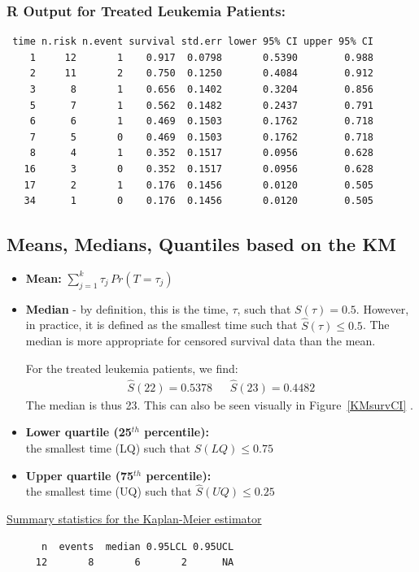 \documentclass[11pt,slidesonly,semrot,portrait,palatino]{book}
\begin{document}
\subsubsection{R Output for Treated Leukemia Patients:}
\begin{verbatim}
 time n.risk n.event survival std.err lower 95% CI upper 95% CI
    1     12       1    0.917  0.0798       0.5390        0.988
    2     11       2    0.750  0.1250       0.4084        0.912
    3      8       1    0.656  0.1402       0.3204        0.856
    5      7       1    0.562  0.1482       0.2437        0.791
    6      6       1    0.469  0.1503       0.1762        0.718
    7      5       0    0.469  0.1503       0.1762        0.718
    8      4       1    0.352  0.1517       0.0956        0.628
   16      3       0    0.352  0.1517       0.0956        0.628
   17      2       1    0.176  0.1456       0.0120        0.505
   34      1       0    0.176  0.1456       0.0120        0.505
\end{verbatim}

\normalsize
\newpage


\subsection{Means, Medians, Quantiles based on the KM}
\begin{itemize}
\item  {\bf Mean:}  $\sum_{j=1}^{k} \tau_j \, Pr(T=\tau_j)$
\item  {\bf Median} - by definition, this is the time, $\tau$,
such that $S(\tau)=0.5$.  However, in practice, it is defined as
the smallest time such that $\hat{S}(\tau)\leq 0.5$.
The median is more appropriate for censored survival data
than the mean.

For the treated leukemia patients, we find:
\begin{eqnarray*}
\hat{S}(22) = 0.5378 ~~~~~~~ \hat{S}(23) = 0.4482
\end{eqnarray*}
The median is thus 23.   This can also be seen visually
in Figure~\ref{KMsurvCI}    .
\item  {\bf Lower quartile (25$^{th}$ percentile):}\\
the smallest time (LQ) such that $\hat{S}(LQ)\leq 0.75$
\item  {\bf Upper quartile (75$^{th}$ percentile):} \\
the smallest time (UQ) such that $\hat{S}(UQ)\leq 0.25$
\end{itemize}
\normalsize
\underline{Summary statistics for the Kaplan-Meier estimator}\\
\begin{verbatim}
      n  events  median 0.95LCL 0.95UCL
     12       8       6       2      NA
\end{verbatim}
\end{document}
